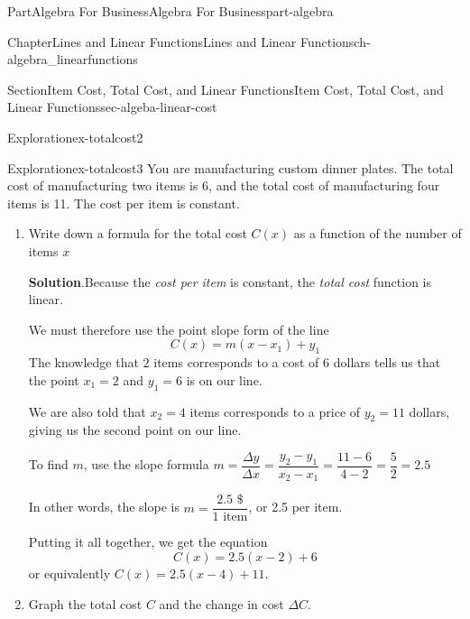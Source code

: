 \documentclass{tufte-book}
\newcommand{\blocktitlefont}{\relax}
\numberwithin{equation}{chapter}
\def \tikzhistogram (#1,#2){\draw[fill=blue,opacity=0.3] ({#1+((\xtwo-\xmin)/5)},#2) rectangle ({#1-((\xtwo-\xmin)/5)},0); \draw[draw,thick] ({#1+((\xtwo-\xmin)/5)},#2) rectangle ({#1-((\xtwo-\xmin)/5)},0); \node[draw,fill=blue, circle,inner sep=2.5pt] at (#1,#2) {};}
\begin{document}
\begin{partptx}{Part}{Algebra For Business}{}{Algebra For Business}{}{}{part-algebra}
\begin{chapterptx}{Chapter}{Lines and Linear Functions}{}{Lines and Linear Functions}{}{}{ch-algebra_linearfunctions}
\begin{sectionptx}{Section}{Item Cost, Total Cost, and Linear Functions}{}{Item Cost, Total Cost, and Linear Functions}{}{}{sec-algeba-linear-cost}
\begin{exploration}{Exploration}{}{ex-totalcost2}
\begin{enumerate}[font=\bfseries,label=(\alph*),ref=\alph*]
\begin{image}{0}{1}{0}{}
{
}%
\end{image}%
\end{enumerate}%
\end{exploration}%
\begin{exploration}{Exploration}{}{ex-totalcost3}%
You are manufacturing custom dinner plates. The total cost of manufacturing two items is \textdollar{}6, and the total cost of manufacturing four items is \textdollar{}11. The cost per item is constant.%
\begin{enumerate}[font=\bfseries,label=(\alph*),ref=\alph*]%
\item{}Write down a formula for the total cost \(C(x)\) as a function of the number of items \(x\)%
\par\smallskip%
\noindent\textbf{\blocktitlefont Solution}.\hypertarget{ex-totalcost3-2-2}{}\quad{}Because the \emph{cost per item} is constant, the \emph{total cost} function is linear.%
\par
We must therefore use the point slope form of the line%
\begin{equation*}
C(x) = m (x-x_1) + y_1	
\end{equation*}
The knowledge that \(2\) items corresponds to a cost of \(6\) dollars tells us that the point \(x_1=2\) and \(y_1=6\) is on our line.%
\par
We are also told that \(x_2=4\) items corresponds to a price of \(y_2=11\) dollars, giving us the second point on our line.%
\par
To find \(m\), use the slope formula \(m = \dfrac{\Delta y}{\Delta x} = \dfrac{y_2-y_1}{x_2-x_1} = \dfrac{11-6}{4-2}=\dfrac{5}{2}=2.5\)%
\par
In other words, the slope is \(m=\dfrac{2.5 \text{ \$}}{1\text{ item}}\), or 2.5 \textdollar{} per item.%
\par
Putting it all together, we get the equation%
\begin{equation*}
C(x) = 2.5 (x - 2) + 6
\end{equation*}
or equivalently \(C(x) = 2.5 (x - 4) + 11\).%
\item{}Graph the total cost \(C\) and the change in cost \(\Delta C\).%

\end{enumerate}
\end{exploration}
\end{sectionptx}
\end{chapterptx}
\end{partptx}
\end{document}
